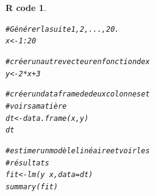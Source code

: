 \documentclass[11pt]{beamer}\usepackage[]{graphicx}\usepackage[]{color}
\makeatletter
\newcommand{\hlnum}[1]{\textcolor[rgb]{0.063,0.58,0.627}{#1}}%
\newcommand{\hlcom}[1]{\textcolor[rgb]{0.588,0.588,0.588}{#1}}%
\newcommand{\hlopt}[1]{\textcolor[rgb]{0.196,0.196,0.196}{#1}}%
\newcommand{\hlstd}[1]{\textcolor[rgb]{0.196,0.196,0.196}{#1}}%
\newcommand{\hlkwb}[1]{\textcolor[rgb]{0.627,0,0.314}{#1}}%
\newcommand{\hlkwc}[1]{\textcolor[rgb]{0,0.631,0.314}{#1}}%
\newcommand{\hlkwd}[1]{\textcolor[rgb]{0.78,0.227,0.412}{#1}}%
\newenvironment{kframe}{%
 \def\at@end@of@kframe{}%
 \ifinner\ifhmode%
  \def\at@end@of@kframe{\end{minipage}}%
  \begin{minipage}{\columnwidth}%
 \fi\fi%
 \def\FrameCommand##1{\hskip\@totalleftmargin \hskip-\fboxsep
 \colorbox{shadecolor}{##1}\hskip-\fboxsep
     \hskip-\linewidth \hskip-\@totalleftmargin \hskip\columnwidth}%
 \MakeFramed {\advance\hsize-\width
   \@totalleftmargin\z@ \linewidth\hsize
   \@setminipage}}%
 {\par\unskip\endMakeFramed%
 \at@end@of@kframe}
\newenvironment{knitrout}{}{} %
\newtheorem{rcode}{R code}[section]
\makeatother
\begin{document}
\begin{frame}
\begin{knitrout}
\color{fgcolor}\begin{kframe}
\begin{rcode}\label{unnamed-chunk-6}\begin{alltt}
\hlcom{# Générer la suite 1, 2, ..., 20.}
\hlstd{x} \hlkwb{<-} \hlnum{1}\hlopt{:}\hlnum{20}

\hlcom{# créer un autre vecteur en fonction de x}
\hlstd{y} \hlkwb{<-} \hlnum{2}\hlopt{*}\hlstd{x}\hlopt{+}\hlnum{3}

\hlcom{# créer un data frame de deux colonnes et}
\hlcom{# voir sa matière }
\hlstd{dt} \hlkwb{<-} \hlkwd{data.frame}\hlstd{(x, y)}
\hlstd{dt}

\hlcom{# estimer un modèle linéaire et voir les}
\hlcom{# résultats}
\hlstd{fit} \hlkwb{<-} \hlkwd{lm}\hlstd{(y} \hlopt{~} \hlstd{x,} \hlkwc{data} \hlstd{= dt)}
\hlkwd{summary}\hlstd{(fit)}
\end{alltt}
\end{rcode}\end{kframe}
\end{knitrout}
\end{frame}

\endgroup
\end{document}

